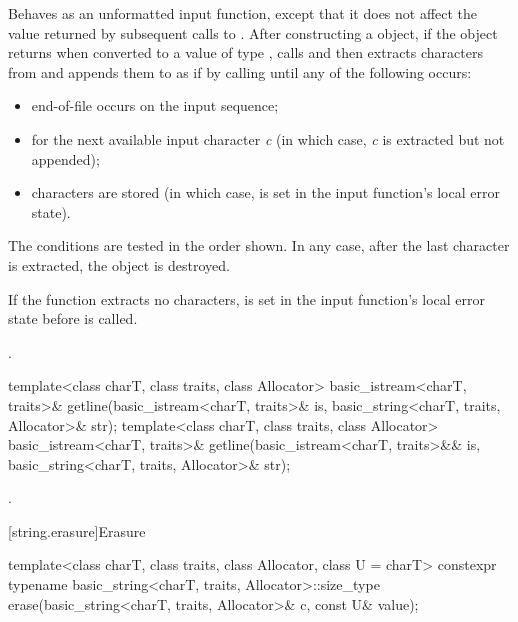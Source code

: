 \begin{itemdescr}
\pnum
\effects
Behaves as an unformatted input function,
except that it does not affect the value returned by subsequent calls to
.
After constructing a  object,
if the  object returns 
when converted to a value of type ,
calls 
and then extracts characters from  and appends them
to  as if by calling
until any of the following occurs:
\begin{itemize}
\item
end-of-file occurs on the input sequence;
\item
{}
for the next available input character
\textit{c}
(in which case,
\textit{c}
is extracted but not appended);
\item
{}
characters are stored
(in which case,
 is set in the input function's local error state).
\end{itemize}

\pnum
The conditions are tested in the order shown.
In any case,
after the last character is extracted, the
object is destroyed.

\pnum
If the function extracts no characters,
 is set in the input function's local error state
before  is called.

\pnum
\returns
{}.
\end{itemdescr}

%
\begin{itemdecl}
template<class charT, class traits, class Allocator>
  basic_istream<charT, traits>&
    getline(basic_istream<charT, traits>& is,
            basic_string<charT, traits, Allocator>& str);
template<class charT, class traits, class Allocator>
  basic_istream<charT, traits>&
    getline(basic_istream<charT, traits>&& is,
            basic_string<charT, traits, Allocator>& str);
\end{itemdecl}

\begin{itemdescr}
\pnum
\returns
{}.
\end{itemdescr}

[string.erasure]{Erasure}

%
\begin{itemdecl}
template<class charT, class traits, class Allocator, class U = charT>
  constexpr typename basic_string<charT, traits, Allocator>::size_type
    erase(basic_string<charT, traits, Allocator>& c, const U& value);
\end{itemdecl}

